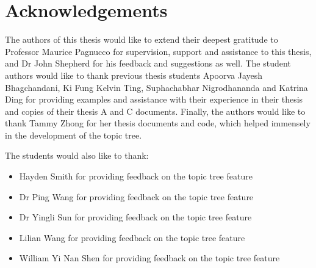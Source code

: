 \chapter*{Acknowledgements}\label{ack}

The authors of this thesis would like to extend their deepest gratitude to Professor Maurice Pagnucco for supervision, support and assistance to this thesis, and Dr John Shepherd for his feedback and suggestions as well.
The student authors would like to thank previous thesis students Apoorva Jayesh Bhagchandani, Ki Fung Kelvin Ting, Suphachabhar Nigrodhananda and Katrina Ding for providing examples and assistance with their experience in their thesis and copies of their thesis A and C documents. Finally, the authors would like to thank Tammy Zhong for her thesis documents and code, which helped immensely in the development of the topic tree.

The students would also like to thank:
\begin{itemize}
    \item Hayden Smith for providing feedback on the topic tree feature
    \item Dr Ping Wang for providing feedback on the topic tree feature
    \item Dr Yingli Sun for providing feedback on the topic tree feature
    \item Lilian Wang for providing feedback on the topic tree feature 
    \item William Yi Nan Shen for providing feedback on the topic tree feature
\end{itemize}